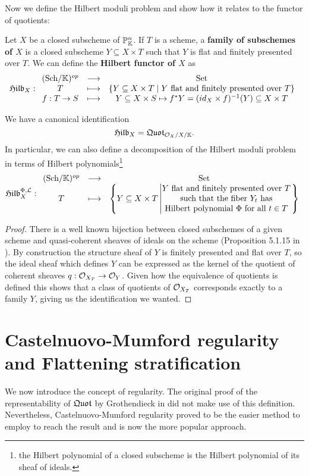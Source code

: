 Now we define the Hilbert moduli problem and show how it relates to the functor of quotients:

\begin{definition}
Let $X$ be a closed subscheme of $\mathbb{P}^n_{\mathbb{K}}$.
If $T$ is a scheme, a \textbf{family of subschemes of $X$} is a closed subscheme $Y\subseteq X\times T$ such that $Y$ is flat and finitely presented over $T$. 
We can define the \textbf{Hilbert functor of $X$} as
\[\mathfrak{Hilb}_{X}:\begin{array}{ccc} {({\mathrm{Sch}}/{\mathbb{K}})^{op}} & \longrightarrow & {\mathrm{Set}}\\ {T} & \longmapsto & {\left\{{Y\subseteq X\times T\mid Y\text{ flat and finitely presented over }T}\right\}}\\ {f:T\to S} & \longmapsto & {Y\subseteq X\times S\mapsto f^\ast Y=(id_{X}\times f)^{-1}(Y)\subseteq X\times T} \end{array}\]
\end{definition}

\begin{proposition}\label{HilbertIsAQuotScheme}
We have a canonical identification
\[\mathfrak{Hilb}_X=\mathfrak{Quot}_{\mathcal{O}_X/X/\mathbb{K}}.\]
In particular, we can also define a decomposition of the Hilbert moduli problem in terms of Hilbert polynomials\footnote{the Hilbert polynomial of a closed subscheme is the Hilbert polynomial of its sheaf of ideals.}
\[\mathfrak{Hilb}^{\Phi,\mathcal{L}}_{X}:\begin{array}{ccc} {({\mathrm{Sch}}/{\mathbb{K}})^{op}} & \longrightarrow & {\mathrm{Set}}\\ {T} & \longmapsto & {\left\{{Y\subseteq X\times T\left| \begin{matrix}Y\text{ flat and finitely presented over $T$}\\\text{such that the fiber $Y_t$ has}\\\text{Hilbert polynomial $\Phi$ for all $t\in T$}\end{matrix}\right.}\right\}} \end{array}\]
\end{proposition}
\begin{proof}
There is a well known bijection between closed subschemes of a given scheme and quasi-coherent sheaves of ideals on the scheme (Proposition 5.1.15 in \cite{QingLiu}). By construction the structure sheaf of $Y$ is finitely presented and flat over $T$, so the ideal sheaf which defines $Y$ can be expressed as the kernel of the quotient of coherent sheaves $q:\mathcal{O}_{X_T}\to \mathcal{O}_Y$. Given how the equivalence of quotients is defined this shows that a class of quotients of $\mathcal{O}_{X_T}$ corresponds exactly to a family $Y$, giving us the identification we wanted.
\end{proof}

\section{Castelnuovo-Mumford regularity and Flattening stratification}

We now introduce the concept of regularity. The original proof of the representability of $\mathfrak{Quot}$ by Grothendieck in \cite{FGAVI} did not make use of this definition. Nevertheless, Castelnuovo-Mumford regularity proved to be the easier method to employ to reach the result and is now the more popular approach.

